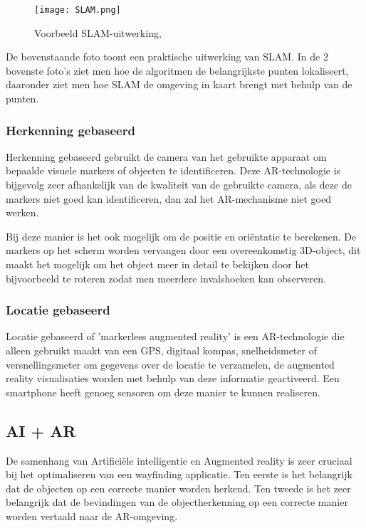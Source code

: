 \begin{figure}[H]
	\centering
	\texttt{[image: SLAM.png]}
	\caption{Voorbeeld SLAM-uitwerking, \autocite{AVRSpot2018}}
\end{figure}

De bovenstaande foto toont een praktische uitwerking van SLAM. In de 2 bovenste foto's ziet men hoe de algoritmen de belangrijkste punten lokaliseert, daaronder ziet men hoe SLAM de omgeving in kaart brengt met behulp van de punten.

\pagebreak
\subsubsection{Herkenning gebaseerd}
Herkenning gebaseerd gebruikt de camera van het gebruikte apparaat om bepaalde visuele markers of objecten te identificeren. Deze AR-technologie is bijgevolg zeer afhankelijk van de kwaliteit van de gebruikte camera, als deze de markers niet goed kan identificeren, dan zal het AR-mechanisme niet goed werken. \autocite{NewGenApps2017}

Bij deze manier is het ook mogelijk om de positie en oriëntatie te berekenen. De markers op het scherm worden vervangen door een overeenkomstig 3D-object, dit maakt het mogelijk om het object meer in detail te bekijken door het bijvoorbeeld te roteren zodat men meerdere invalshoeken kan observeren.

\subsubsection{Locatie gebaseerd}
Locatie gebaseerd of 'markerless augmented reality' is een AR-technologie die alleen gebruikt maakt van een GPS, digitaal kompas, snelheidsmeter of versnellingsmeter om gegevens over de locatie te verzamelen, de augmented reality visualisaties worden met behulp van deze informatie geactiveerd. Een smartphone heeft genoeg sensoren om deze manier te kunnen realiseren. \autocite{NewGenApps2017}

\subsection{AI + AR}
De samenhang van Artificiële intelligentie en Augmented reality is zeer cruciaal bij het optimaliseren van een wayfinding applicatie. Ten eerste is het belangrijk dat de objecten op een correcte manier worden herkend. Ten tweede is het zeer belangrijk dat de bevindingen van de objectherkenning op een correcte manier worden vertaald naar de AR-omgeving. 
\newpage
